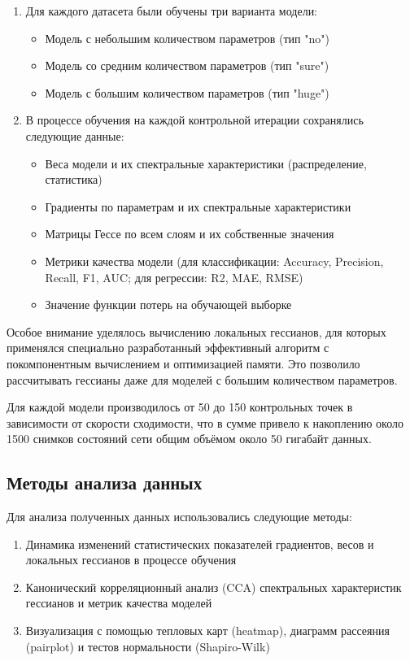 \documentclass[a4paper,12pt]{article}
\begin{document}
\begin{enumerate}
  \item Для каждого датасета были обучены три варианта модели:
    \begin{itemize}
      \item Модель с небольшим количеством параметров (тип "no")
      \item Модель со средним количеством параметров (тип "sure")
      \item Модель с большим количеством параметров (тип "huge")
    \end{itemize}

  \item В процессе обучения на каждой контрольной итерации сохранялись следующие данные:
    \begin{itemize}
      \item Веса модели и их спектральные характеристики (распределение, статистика)
      \item Градиенты по параметрам и их спектральные характеристики
      \item Матрицы Гессе по всем слоям и их собственные значения
      \item Метрики качества модели (для классификации: Accuracy, Precision, Recall, F1, AUC; для регрессии:
        R2, MAE, RMSE)
      \item Значение функции потерь на обучающей выборке
    \end{itemize}
\end{enumerate}

Особое внимание уделялось вычислению локальных гессианов, для которых применялся специально разработанный
эффективный алгоритм с покомпонентным вычислением и оптимизацией памяти. Это позволило рассчитывать гессианы
даже для моделей с большим количеством параметров.

Для каждой модели производилось от 50 до 150 контрольных точек в зависимости от скорости сходимости, что в
сумме привело к накоплению около 1500 снимков состояний сети общим объёмом около 50 гигабайт данных.

\subsection{Методы анализа данных}

Для анализа полученных данных использовались следующие методы:
\begin{enumerate}
  \item Динамика изменений статистических показателей градиентов, весов и локальных гессианов в процессе обучения
  \item Канонический корреляционный анализ (CCA) спектральных характеристик гессианов и метрик качества моделей
  \item Визуализация с помощью тепловых карт (heatmap), диаграмм рассеяния (pairplot) и тестов нормальности
    (Shapiro-Wilk)
\end{enumerate}
\end{document}
